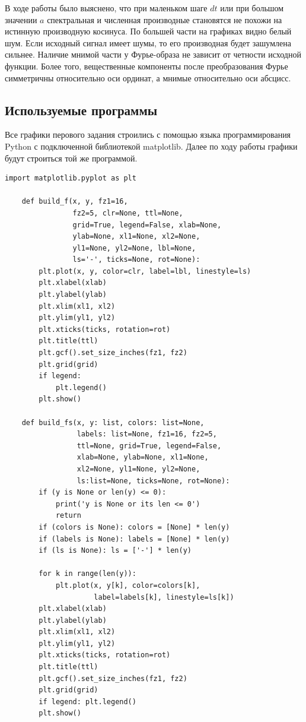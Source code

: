 \documentclass[a4paper, 12pt]{article}
\begin{document}
    В ходе работы было выяснено, что при маленьком шаге $dt$ или при большом значении $a$ спектральная и численная производные
    становятся не похожи на истинную производную косинуса. По большей части на графиках видно белый шум. Если исходный сигнал
    имеет шумы, то его производная будет зашумлена сильнее. Наличие мнимой части у Фурье-образа не зависит от четности исходной
    функции. Более того, вещественные компоненты после преобразования Фурье симметричны относительно оси ординат, а мнимые относительно
    оси абсцисс.


    \subsection{Используемые программы}
    Все графики перового задания строились с помощью языка программирования Python с подключенной библиотекой matplotlib. Далее
    по ходу работы графики будут строиться той же программой. 
    \begin{lstlisting}[label=task1, caption={Файл с программой для построения графиков}]
    import matplotlib.pyplot as plt

    def build_f(x, y, fz1=16,
                fz2=5, clr=None, ttl=None,
                grid=True, legend=False, xlab=None,
                ylab=None, xl1=None, xl2=None,
                yl1=None, yl2=None, lbl=None,
                ls='-', ticks=None, rot=None):
        plt.plot(x, y, color=clr, label=lbl, linestyle=ls)
        plt.xlabel(xlab)
        plt.ylabel(ylab)
        plt.xlim(xl1, xl2)
        plt.ylim(yl1, yl2)
        plt.xticks(ticks, rotation=rot)
        plt.title(ttl)
        plt.gcf().set_size_inches(fz1, fz2)
        plt.grid(grid)
        if legend:
            plt.legend()
        plt.show()
                
    def build_fs(x, y: list, colors: list=None,
                 labels: list=None, fz1=16, fz2=5,
                 ttl=None, grid=True, legend=False, 
                 xlab=None, ylab=None, xl1=None,
                 xl2=None, yl1=None, yl2=None,
                 ls:list=None, ticks=None, rot=None):
        if (y is None or len(y) <= 0):
            print('y is None or its len <= 0')
            return
        if (colors is None): colors = [None] * len(y)
        if (labels is None): labels = [None] * len(y)
        if (ls is None): ls = ['-'] * len(y)
        
        for k in range(len(y)):
            plt.plot(x, y[k], color=colors[k],
                     label=labels[k], linestyle=ls[k])
        plt.xlabel(xlab)
        plt.ylabel(ylab)
        plt.xlim(xl1, xl2)
        plt.ylim(yl1, yl2)
        plt.xticks(ticks, rotation=rot)
        plt.title(ttl)
        plt.gcf().set_size_inches(fz1, fz2)
        plt.grid(grid)
        if legend: plt.legend()
        plt.show()
    \end{lstlisting}
\end{document}
